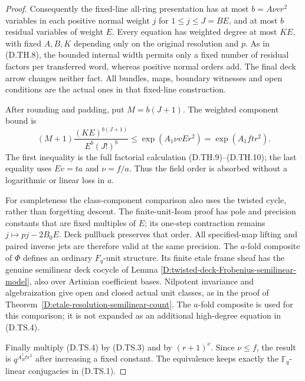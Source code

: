 \begin{proof}
Consequently the fixed-line all-ring presentation has
at most $b=A\nu vr^2$ variables in each positive
normal weight $j$ for $1\leq j\leq J=BE$, and at
most $b$ residual variables of weight $E$. Every
equation has weighted degree at most $KE$, with fixed
$A,B,K$ depending only on the original resolution and
$p$. As in (D.TH.8), the bounded internal width permits
only a fixed number of residual factors per transferred
word, whereas positive normal orders add. The final
deck arrow changes neither fact. All bundles, maps,
boundary witnesses and open conditions are the actual
ones in that fixed-line construction.

After rounding and padding, put $M=b(J+1)$. The
weighted component bound is
\[
 (M+1)\frac{(KE)^{b(J+1)}}{E^b(J!)^b}
             \leq\exp(A_1\nu vE r^2)
             =\exp(A_1ftr^2).                         \tag{D.TS.4}
\]
The first inequality is the full factorial calculation
(D.TH.9)--(D.TH.10); the last equality uses $Ev=ta$
and $\nu=f/a$. Thus the field order is absorbed
without a logarithmic or linear loss in $a$.

For completeness the class-component comparison also
uses the twisted cycle, rather than forgetting descent.
The finite-unit-Isom proof has pole and precision
constants that are fixed multiples of $E$; its
one-step contraction remains $j\mapsto pj-2B_0E$.
Deck pullback preserves that order. All specified-map
lifting and paired inverse jets are therefore valid at
the same precision. The $a$-fold composite of $\Phi$
defines an ordinary $F_q$-unit structure. Its finite
etale frame sheaf has the genuine semilinear deck
cocycle of Lemma
\ref{D:twisted-deck-Frobenius-semilinear-model}, also
over Artinian coefficient bases. Nilpotent invariance
and algebraization give open and closed actual unit
classes, as in the proof of
Theorem~\ref{D:etale-resolution-semilinear-count}.
The $a$-fold composite is used for this comparison;
it is not expanded as an additional high-degree
equation in (D.TS.4).

Finally multiply (D.TS.4) by (D.TS.3) and by
$(r+1)^\nu$. Since $\nu\leq f$, the result is
$q^{A_R^\dagger tr^2}$ after increasing a fixed
constant. The equivalence keeps exactly the
$\mathbb F_q$-linear conjugacies in (D.TS.1).
\end{proof}

